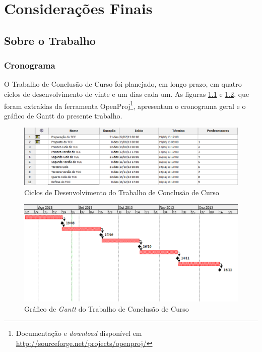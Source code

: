\chapter{Considerações Finais}


\section{Sobre o Trabalho}


\subsection{Cronograma} 
O Trabalho de Conclusão de Curso foi planejado, em longo prazo, em quatro ciclos 
de desenvolvimento de vinte e um dias cada um. As figuras \ref{cronograma} e 
\ref{gantt}, que foram extraídas da ferramenta OpenProj\footnote{Documentação e 
\textit{download} disponível em 
\url{http://sourceforge.net/projects/openproj/}}, apresentam o cronograma geral 
e o gráfico de Gantt do presente trabalho.

\begin{figure}[h]
\centering
	\includegraphics[keepaspectratio=true,scale=0.7]{figuras/marcos.eps}
	\caption{Ciclos de Desenvolvimento do Trabalho de Conclusão de Curso}
	\label{cronograma}
\end{figure}


\begin{figure}[h]
\centering
	\includegraphics[keepaspectratio=true,scale=0.7]{figuras/gantt_chart.eps}
	\caption{Gráfico de \textit{Gantt} do Trabalho de Conclusão de Curso}
	\label{gantt}
\end{figure}

